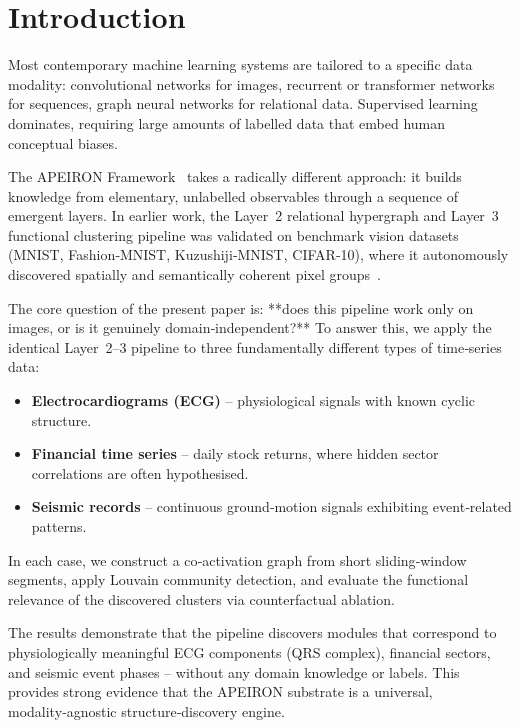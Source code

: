 \section{Introduction}\label{sec:intro}
Most contemporary machine learning systems are tailored to a specific data modality: convolutional networks for images, recurrent or transformer networks for sequences, graph neural networks for relational data.
Supervised learning dominates, requiring large amounts of labelled data that embed human conceptual biases.

The APEIRON Framework~\cite{Beniers2026Apeiron} takes a radically different approach: it builds knowledge from elementary, unlabelled observables through a sequence of emergent layers.
In earlier work, the Layer~2 relational hypergraph and Layer~3 functional clustering pipeline was validated on benchmark vision datasets (MNIST, Fashion‑MNIST, Kuzushiji‑MNIST, CIFAR‑10), where it autonomously discovered spatially and semantically coherent pixel groups~\cite{Beniers2026Empirical}.

The core question of the present paper is: **does this pipeline work only on images, or is it genuinely domain‑independent?**
To answer this, we apply the identical Layer~2--3 pipeline to three fundamentally different types of time‑series data:
\begin{itemize}
\item \textbf{Electrocardiograms (ECG)} – physiological signals with known cyclic structure.
\item \textbf{Financial time series} – daily stock returns, where hidden sector correlations are often hypothesised.
\item \textbf{Seismic records} – continuous ground‑motion signals exhibiting event‑related patterns.
\end{itemize}
In each case, we construct a co‑activation graph from short sliding‑window segments, apply Louvain community detection, and evaluate the functional relevance of the discovered clusters via counterfactual ablation.

The results demonstrate that the pipeline discovers modules that correspond to physiologically meaningful ECG components (QRS complex), financial sectors, and seismic event phases – without any domain knowledge or labels.
This provides strong evidence that the APEIRON substrate is a universal, modality‑agnostic structure‑discovery engine.
